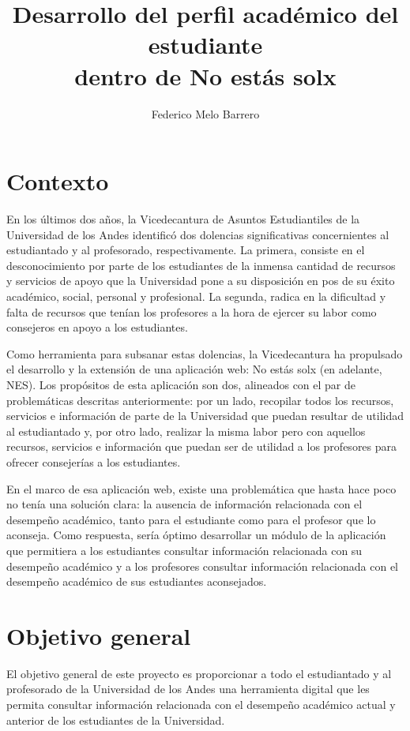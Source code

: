\documentclass{proposal}
\title{Desarrollo del perfil académico del estudiante\\dentro de No estás solx}
\author{Federico Melo Barrero\inst{1}}
\begin{document}
\maketitle

\section{Contexto}

En los últimos dos años, la Vicedecantura de Asuntos Estudiantiles de la Universidad de los Andes identificó dos dolencias significativas concernientes al estudiantado y al profesorado, respectivamente. La primera, consiste en el desconocimiento por parte de los estudiantes de la inmensa cantidad de recursos y servicios de apoyo que la Universidad pone a su disposición en pos de su éxito académico, social, personal y profesional. La segunda, radica en la dificultad y falta de recursos que tenían los profesores a la hora de ejercer su labor como consejeros en apoyo a los estudiantes.

Como herramienta para subsanar estas dolencias, la Vicedecantura ha propulsado el desarrollo y la extensión de una aplicación web: No estás solx (en adelante, NES). Los propósitos de esta aplicación son dos, alineados con el par de problemáticas descritas anteriormente: por un lado, recopilar todos los recursos, servicios e información de parte de la Universidad que puedan resultar de utilidad al estudiantado y, por otro lado, realizar la misma labor pero con aquellos recursos, servicios e información que puedan ser de utilidad a los profesores para ofrecer consejerías a los estudiantes.

En el marco de esa aplicación web, existe una problemática que hasta hace poco no tenía una solución clara: la ausencia de información relacionada con el desempeño académico, tanto para el estudiante como para el profesor que lo aconseja. Como respuesta, sería óptimo desarrollar un módulo de la aplicación que permitiera a los estudiantes consultar información relacionada con su desempeño académico y a los profesores consultar información relacionada con el desempeño académico de sus estudiantes aconsejados.


\section{Objetivo general}

El objetivo general de este proyecto es proporcionar a todo el estudiantado y al profesorado de la Universidad de los Andes una herramienta digital que les permita consultar información relacionada con el desempeño académico actual y anterior de los estudiantes de la Universidad.
\end{document}
